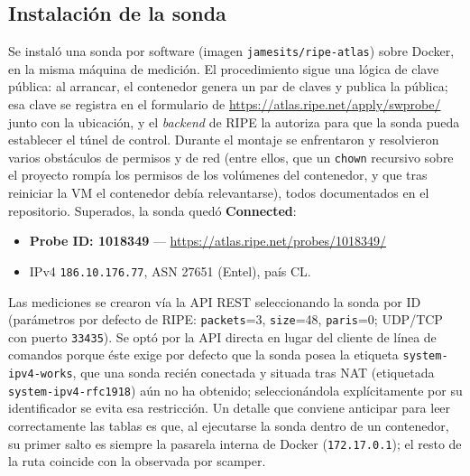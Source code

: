 \documentclass[11pt,a4paper]{article}
\newcommand{\ip}[1]{\texttt{#1}}
\begin{document}
\subsection{Instalación de la sonda}
Se instaló una sonda por software (imagen \texttt{jamesits/ripe-atlas}) sobre Docker, en la misma
máquina de medición. El procedimiento sigue una lógica de clave pública: al arrancar, el
contenedor genera un par de claves y publica la pública; esa clave se registra en el formulario
de \url{https://atlas.ripe.net/apply/swprobe/} junto con la ubicación, y el \emph{backend} de
RIPE la autoriza para que la sonda pueda establecer el túnel de control. Durante el montaje se
enfrentaron y resolvieron varios obstáculos de permisos y de red (entre ellos, que un
\texttt{chown} recursivo sobre el proyecto rompía los permisos de los volúmenes del contenedor, y
que tras reiniciar la VM el contenedor debía relevantarse), todos documentados en el repositorio.
Superados, la sonda quedó \textbf{Connected}:
\begin{itemize}[nosep]
  \item \textbf{Probe ID: 1018349} --- \url{https://atlas.ripe.net/probes/1018349/}
  \item IPv4 \ip{186.10.176.77}, ASN 27651 (Entel), país CL.
\end{itemize}
Las mediciones se crearon vía la API REST seleccionando la sonda por ID (parámetros por defecto
de RIPE: \texttt{packets}=3, \texttt{size}=48, \texttt{paris}=0; UDP/TCP con puerto \ip{33435}).
Se optó por la API directa en lugar del cliente de línea de comandos porque éste exige por
defecto que la sonda posea la etiqueta \texttt{system-ipv4-works}, que una sonda recién conectada
y situada tras NAT (etiquetada \texttt{system-ipv4-rfc1918}) aún no ha obtenido; seleccionándola
explícitamente por su identificador se evita esa restricción. Un detalle que conviene anticipar
para leer correctamente las tablas es que, al ejecutarse la sonda dentro de un contenedor, su
primer salto es siempre la pasarela interna de Docker (\ip{172.17.0.1}); el resto de la ruta
coincide con la observada por scamper.
\end{document}

